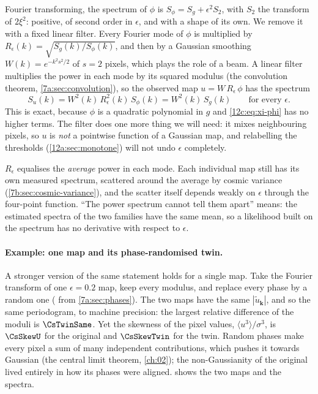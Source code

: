 Fourier transforming, the spectrum of $\phi$ is $S_\phi=S_g+\epsilon^2S_{2}$, with $S_{2}$ the transform of
$2\xi^2$: positive, of second order in $\epsilon$, and with a shape of its own. We remove it with a fixed linear
filter. Every Fourier mode of $\phi$ is multiplied by $R_\epsilon(k)=\sqrt{S_g(k)/S_\phi(k)}$, and then by a Gaussian
smoothing $W(k)=e^{-k^2s^2/2}$ of $s=2$ pixels, which plays the role of a beam. A linear filter multiplies the power
in each mode by its squared modulus (the convolution theorem, \cref{7a:sec:convolution}), so the observed map
$u=W\,R_\epsilon\,\phi$ has the spectrum
\begin{equation}
  S_u(k)=W^2(k)\,R_\epsilon^2(k)\,S_\phi(k)=W^2(k)\,S_g(k)\qquad\text{for every }\epsilon .
  \label{12c:eq:same-spectrum}
\end{equation}
This is exact, because $\phi$ is a quadratic polynomial in $g$ and \eqref{12c:eq:xi-phi} has no higher terms. The
filter does one more thing we will need: it mixes neighbouring pixels, so $u$ is \emph{not} a pointwise function of a
Gaussian map, and relabelling the thresholds (\cref{12a:sec:monotone}) will not undo $\epsilon$ completely.

\begin{pitfall}
$R_\epsilon$ equalises the \emph{average} power in each mode. Each individual map still has its own measured spectrum,
scattered around the average by cosmic variance (\cref{7b:sec:cosmic-variance}), and the scatter itself depends weakly
on $\epsilon$ through the four-point function. ``The power spectrum cannot tell them apart'' means: the estimated spectra
of the two families have the same mean, so a likelihood built on the spectrum has no derivative with respect to
$\epsilon$.
\end{pitfall}

\paragraph{Example: one map and its phase-randomised twin.} A stronger version of the same statement holds for a
single map. Take the Fourier transform of one $\epsilon=0.2$ map, keep every modulus, and replace every phase by a
random one ( from \cref{7a:sec:phases}). The two maps have the same $|\tilde u_{\bm k}|$, and so
the same periodogram, to machine precision: the largest relative difference of the moduli is $\CsTwinSame$. Yet the
skewness of the pixel values, $\langle u^3\rangle/\sigma^3$, is $\CsSkewU$ for the original and $\CsSkewTwin$ for the
twin. Random phases make every pixel a sum of many independent contributions, which pushes it towards Gaussian (the
central limit theorem, \cref{ch:02}); the non-Gaussianity of the original lived entirely in how its phases were
aligned.  shows the two maps and the spectra.


